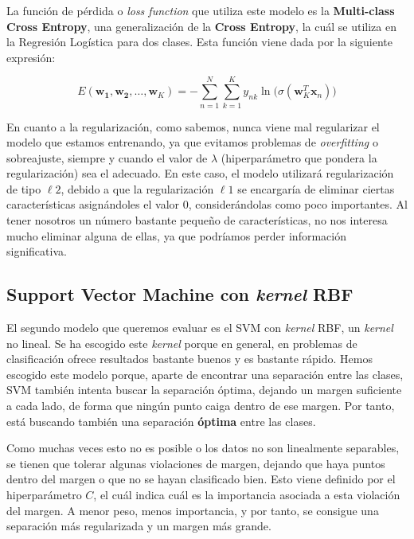\documentclass[11pt,a4paper]{article}
\begin{document}
La función de pérdida o \textit{loss function} que utiliza este modelo es la \textbf{Multi-class Cross Entropy}, una generalización de la
\textbf{Cross Entropy}, la cuál se utiliza en la Regresión Logística para dos clases. Esta función viene dada por la siguiente expresión:

\begin{equation}
\label{eq:mult-cross-entropy}
E(\mathbf{w_1}, \mathbf{w_2}, \dots, \mathbf{w}_K) = -\sum_{n=1}^N \sum_{k=1}^{K} y_{nk} \ln \Big(\sigma (\mathbf{w}_K^T \mathbf{x}_n)\Big)
\end{equation}

En cuanto a la regularización, como sabemos, nunca viene mal regularizar el modelo que estamos entrenando, ya que evitamos problemas de
\textit{overfitting} o sobreajuste, siempre y cuando el valor de $\lambda$ (hiperparámetro que pondera la regularización) sea el adecuado. 
En este caso, el modelo utilizará regularización de tipo $\ell 2$, debido a que la regularización $\ell 1$ se encargaría de eliminar ciertas
características asignándoles el valor 0, considerándolas como poco importantes. Al tener nosotros un número bastante pequeño de
características, no nos interesa mucho eliminar alguna de ellas, ya que podríamos perder información significativa.

\subsection{Support Vector Machine con \textit{kernel} RBF}

El segundo modelo que queremos evaluar es el SVM con \textit{kernel} RBF, un \textit{kernel} no lineal. Se ha escogido este \textit{kernel}
porque en general, en problemas de clasificación ofrece resultados bastante buenos y es bastante rápido. Hemos escogido este modelo porque,
aparte de encontrar una separación entre las clases, SVM también intenta buscar la separación óptima, dejando un margen suficiente a cada
lado, de forma que ningún punto caiga dentro de ese margen. Por tanto, está buscando también una separación \textbf{óptima} entre las clases.

Como muchas veces esto no es posible o los datos no son linealmente separables, se tienen que tolerar algunas violaciones de margen, dejando
que haya puntos dentro del margen o que no se hayan clasificado bien. Esto viene definido por el hiperparámetro $C$, el cuál indica cuál
es la importancia asociada a esta violación del margen. A menor peso, menos importancia, y por tanto, se consigue una separación más
regularizada y un margen más grande.
\end{document}
